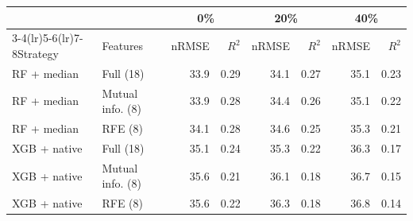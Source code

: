 \begin{tabular}{llrrrrrr}
\toprule
 & & \multicolumn{2}{c}{0\%} & \multicolumn{2}{c}{20\%} & \multicolumn{2}{c}{40\%} \\ \cmidrule(lr){3-4}\cmidrule(lr){5-6}\cmidrule(lr){7-8}Strategy & Features & nRMSE & $R^2$ & nRMSE & $R^2$ & nRMSE & $R^2$ \\
\midrule
RF + median & Full (18) & 33.9 & 0.29 & 34.1 & 0.27 & 35.1 & 0.23 \\
RF + median & Mutual info. (8) & 33.9 & 0.28 & 34.4 & 0.26 & 35.1 & 0.22 \\
RF + median & RFE (8) & 34.1 & 0.28 & 34.6 & 0.25 & 35.3 & 0.21 \\
XGB + native & Full (18) & 35.1 & 0.24 & 35.3 & 0.22 & 36.3 & 0.17 \\
XGB + native & Mutual info. (8) & 35.6 & 0.21 & 36.1 & 0.18 & 36.7 & 0.15 \\
XGB + native & RFE (8) & 35.6 & 0.22 & 36.3 & 0.18 & 36.8 & 0.14 \\
\bottomrule
\end{tabular}
